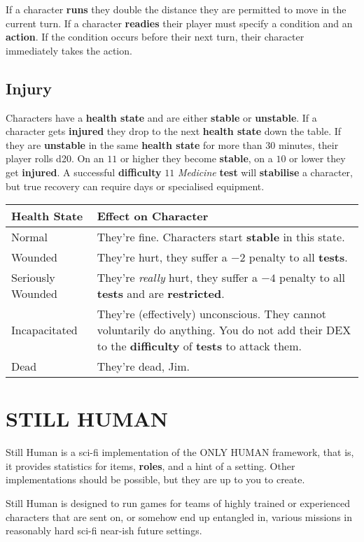\documentclass[11pt]{article}
\begin{document}
\begin{multicols}{3}
  If a character \textbf{runs} they double the distance they are permitted to move in the current turn. If a character \textbf{readies} their player must specify a condition and an \textbf{action}. If the condition occurs before their next turn, their character immediately takes the action.

  \subsection*{Injury}

  Characters have a \textbf{health state} and are either \textbf{stable} or \textbf{unstable}. If a character gets \textbf{injured} they drop to the next \textbf{health state} down the table. If they are \textbf{unstable} in the same \textbf{health state} for more than $30$ minutes, their player rolls d20. On an $11$ or higher they become \textbf{stable}, on a $10$ or lower they get \textbf{injured}. A successful \textbf{difficulty} $11$ \textit{Medicine} \textbf{test} will \textbf{stabilise} a character, but true recovery can require days or specialised equipment.

  \begin{tabularx}{\linewidth}{lX}
    Health State & Effect on Character \\
    \hline
    Normal & They're fine. Characters start \textbf{stable} in this state. \\
    Wounded & They're hurt, they suffer a $-2$ penalty to all \textbf{tests}. \\
    Seriously Wounded & They're \textit{really} hurt, they suffer a $-4$ penalty to all \textbf{tests} and are \textbf{restricted}. \\
    Incapacitated & They're (effectively) unconscious. They cannot voluntarily do anything. You do not add their DEX to the \textbf{difficulty} of \textbf{tests} to attack them. \\
    Dead & They're dead, Jim.
  \end{tabularx}

  \section*{STILL HUMAN}

  Still Human is a sci-fi implementation of the ONLY HUMAN framework, that is, it provides statistics for items, \textbf{roles}, and a hint of a setting. Other implementations should be possible, but they are up to you to create.

  Still Human is designed to run games for teams of highly trained or experienced characters that are sent on, or somehow end up entangled in, various missions in reasonably hard sci-fi near-ish future settings.


\end{multicols}
\end{document}
